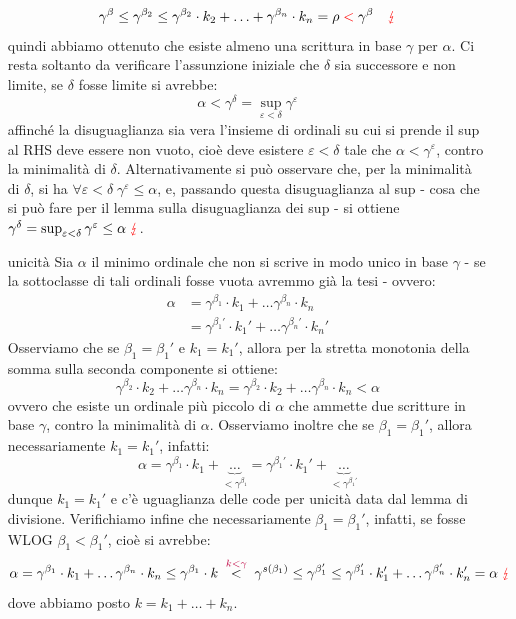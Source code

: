 \begin{soln}
\begin{itemize}
		\[ \gamma^\beta \leq \gamma^{\beta_2} \leq \gamma^{\beta_2} \cdot k_2 + \ldots + \gamma^{\beta_n} \cdot k_n = \rho \;\textcolor{red}<\; \gamma^{\beta} \quad \textcolor{red}\lightning
			\]
		quindi abbiamo ottenuto che esiste almeno una scrittura in base $\gamma$ per $\alpha$. Ci resta soltanto da verificare l'assunzione iniziale che $\delta$ sia successore e non limite, se $\delta$ fosse limite si avrebbe:
		\[ \alpha < \gamma^\delta = \sup_{\varepsilon < \delta} \gamma^{\varepsilon}
			\]
		affinché la disuguaglianza sia vera l'insieme di ordinali su cui si prende il sup al RHS deve essere non vuoto, cioè deve esistere $\varepsilon < \delta$ tale che $\alpha < \gamma^{\varepsilon}$, contro la minimalità di $\delta$. Alternativamente
		si può osservare che, per la minimalità di $\delta$, si ha $\forall \varepsilon < \delta \; \gamma^{\varepsilon} \leq \alpha$, e, passando questa disuguaglianza al sup - cosa che si può fare per il lemma sulla disuguaglianza dei sup - si ottiene $\gamma^\delta = \sup_{\varepsilon < \delta} \gamma^{\varepsilon} \leq \alpha \; \textcolor{red}\lightning$.
		\item[$\boxed{\text{unicità}}$] Sia $\alpha$ il minimo ordinale che non si scrive in modo unico in base $\gamma$ - se la sottoclasse di tali ordinali fosse vuota avremmo già la tesi - ovvero:
		\begin{align*}
			\alpha &= \gamma^{\beta_1}\cdot k_1 + \ldots \gamma^{\beta_n}\cdot k_n \\
				   &= \gamma^{\beta_1'}\cdot k_1' + \ldots \gamma^{\beta_n'}\cdot k_n'
		\end{align*}
		Osserviamo che se $\beta_1 = \beta_1'$ e $k_1 = k_1'$, allora per la stretta monotonia della somma sulla seconda componente si ottiene:
		\[ \gamma^{\beta_2}\cdot k_2 + \ldots \gamma^{\beta_n}\cdot k_n = \gamma^{\beta_2}\cdot k_2 + \ldots \gamma^{\beta_n}\cdot k_n < \alpha
			\]
		ovvero che esiste un ordinale più piccolo di $\alpha$ che ammette due scritture in base $\gamma$, contro la minimalità di $\alpha$. Osserviamo inoltre che se $\beta_1 = \beta_1'$,
		allora necessariamente $k_1 = k_1'$, infatti:
		\[ \alpha = \gamma^{\beta_1}\cdot k_1 + \underbrace{\ldots}_{<\gamma^{\beta_1}} = \gamma^{\beta_1'} \cdot k_1' + \underbrace{\ldots}_{<\gamma^{\beta_1'}} 
			\]
		dunque $k_1 = k_1'$ e c'è uguaglianza delle code per unicità data dal lemma di divisione.
		Verifichiamo infine che necessariamente $\beta_1 = \beta_1 '$, infatti, se fosse WLOG $\beta_1 < \beta_1'$, cioè si avrebbe:
		\[ \alpha = \gamma^{\beta_1}\cdot k_1 + \ldots \gamma^{\beta_n}\cdot k_n \leq \gamma^{\beta_1} \cdot k \;\overset{\textcolor{purple}{k < \gamma}}{<}\; \gamma^{s(\beta_1)} \leq \gamma^{\beta_1 '} \leq \gamma^{\beta_1'}\cdot k_1' + \ldots \gamma^{\beta_n'}\cdot k_n' = \alpha \; \textcolor{red}\lightning
			\]
		dove abbiamo posto $k = k_1 + \ldots + k_n$.
	\end{itemize}
\end{soln}

